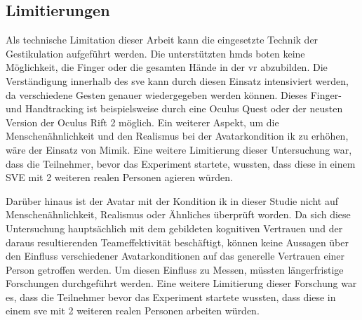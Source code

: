 \documentclass[a4paper,11pt]{article}%
\renewcommand{\\}{\vspace*{0.5\baselineskip} \newline}
\begin{document}
%			



\subsection{Limitierungen}
Als technische Limitation dieser Arbeit kann die eingesetzte Technik der Gestikulation aufgeführt werden. Die unterstützten \ac{hmd}s boten keine Möglichkeit, die Finger oder die gesamten Hände in der \ac{vr} abzubilden. Die Verständigung innerhalb des \ac{sve} kann durch diesen Einsatz intensiviert werden, da verschiedene Gesten genauer wiedergegeben werden können. Dieses Finger- und Handtracking ist beispielsweise durch eine Oculus Quest oder der neusten Version der Oculus Rift 2 möglich. Ein weiterer Aspekt, um die Menschenähnlichkeit und den Realismus bei der Avatarkondition \ac{ik} zu erhöhen, wäre der Einsatz von Mimik.
Eine weitere Limitierung dieser Untersuchung war, dass die Teilnehmer, bevor das Experiment startete, wussten, dass diese in einem SVE mit 2 weiteren realen Personen agieren würden. 

Darüber hinaus ist der Avatar mit der Kondition \ac{ik} in dieser Studie nicht auf Menschenähnlichkeit, Realismus oder Ähnliches überprüft worden. 
Da sich diese Untersuchung hauptsächlich mit dem gebildeten kognitiven Vertrauen und der daraus resultierenden Teameffektivität beschäftigt, können keine Aussagen über den Einfluss verschiedener Avatarkonditionen auf das generelle Vertrauen einer Person getroffen werden. Um diesen Einfluss zu Messen, müssten längerfristige Forschungen durchgeführt werden. Eine weitere Limitierung dieser Forschung war es, dass die Teilnehmer bevor das Experiment startete wussten, dass diese in einem \ac{sve} mit 2 weiteren realen Personen arbeiten würden. 


%
\end{document}

